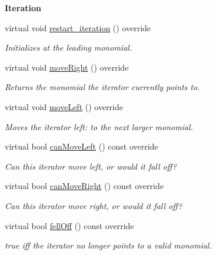 \begin{Indent}\textbf{ Iteration}\par
\begin{DoxyCompactItemize}
\item 
\mbox{\label{group___iterator_group_ab369923171f62e5f0cdb83ef7dd6f6e8}} 
virtual void \hyperlink{group___iterator_group_ab369923171f62e5f0cdb83ef7dd6f6e8}{restart\+\_\+iteration} () override
\begin{DoxyCompactList}\small\item\em Initializes at the leading monomial. \end{DoxyCompactList}\item 
virtual void \hyperlink{group___iterator_group_a2bb830c4e310d91b39e55b05ce86840c}{move\+Right} () override
\begin{DoxyCompactList}\small\item\em Returns the monomial the iterator currently points to. \end{DoxyCompactList}\item 
\mbox{\label{group___iterator_group_a5ede434de909b2391d83b3bca4fdc4d7}} 
virtual void \hyperlink{group___iterator_group_a5ede434de909b2391d83b3bca4fdc4d7}{move\+Left} () override
\begin{DoxyCompactList}\small\item\em Moves the iterator left\+: to the next larger monomial. \end{DoxyCompactList}\item 
\mbox{\label{group___iterator_group_a2df38ef3fd64b5e90432c754ce21f0c4}} 
virtual bool \hyperlink{group___iterator_group_a2df38ef3fd64b5e90432c754ce21f0c4}{can\+Move\+Left} () const override
\begin{DoxyCompactList}\small\item\em Can this iterator move left, or would it fall off? \end{DoxyCompactList}\item 
\mbox{\label{group___iterator_group_adbd438dcd2aafa61eb2c07873b90f751}} 
virtual bool \hyperlink{group___iterator_group_adbd438dcd2aafa61eb2c07873b90f751}{can\+Move\+Right} () const override
\begin{DoxyCompactList}\small\item\em Can this iterator move right, or would it fall off? \end{DoxyCompactList}\item 
\mbox{\label{group___iterator_group_ab6471b426bf5645dacd2369c0ab441f5}} 
virtual bool \hyperlink{group___iterator_group_ab6471b426bf5645dacd2369c0ab441f5}{fell\+Off} () const override
\begin{DoxyCompactList}\small\item\em true iff the iterator no longer points to a valid monomial. \end{DoxyCompactList}\end{DoxyCompactItemize}
\end{Indent}
